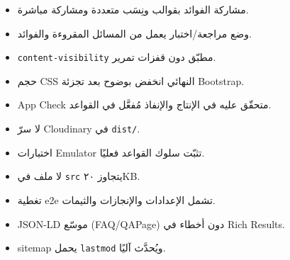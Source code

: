 \documentclass[11pt]{article}
\begin{document}
\begin{itemize}
  \item[${\color{okgreen}\faCheckCircle}$] مشاركة الفوائد بقوالب ونِسَب متعددة ومشاركة مباشرة.
  \item[${\color{okgreen}\faCheckCircle}$] وضع مراجعة/اختبار يعمل من المسائل المقروءة والفوائد.
  \item[${\color{okgreen}\faCheckCircle}$] \texttt{content-visibility} مطبّق دون قفزات تمرير.
  \item[${\color{okgreen}\faCheckCircle}$] حجم CSS النهائي انخفض بوضوح بعد تجزئة Bootstrap.
  \item[${\color{okgreen}\faCheckCircle}$] App Check متحقّق عليه في الإنتاج والإنفاذ مُفعَّل في القواعد.
  \item[${\color{okgreen}\faCheckCircle}$] لا سرّ Cloudinary في \texttt{dist/}.
  \item[${\color{okgreen}\faCheckCircle}$] اختبارات Emulator تثبّت سلوك القواعد فعليًا.
  \item[${\color{okgreen}\faCheckCircle}$] لا ملف في \texttt{src} يتجاوز ٢٠KB.
  \item[${\color{okgreen}\faCheckCircle}$] تغطية e2e تشمل الإعدادات والإنجازات والثيمات.
  \item[${\color{okgreen}\faCheckCircle}$] JSON-LD موسّع (FAQ/QAPage) دون أخطاء في Rich Results.
  \item[${\color{okgreen}\faCheckCircle}$] sitemap يحمل \texttt{lastmod} ويُحدَّث آليًا.
\end{itemize}
\end{document}
